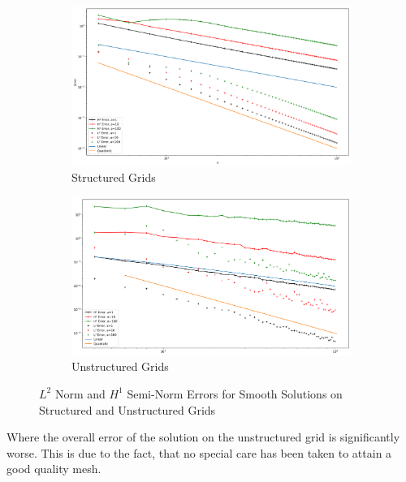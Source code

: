 \documentclass[11pt,a4paper]{article}
\begin{document}
\begin{multicols}{2}
\begin{figure}[H]
  \centering
  \begin{subfigure}{1\linewidth}
    \centering
    \includegraphics[width=1\linewidth]{errors_smooth_reg}
    \caption{Structured Grids}
    \label{fig:smooth_dirichlet_errs_str}
  \end{subfigure}

  \begin{subfigure}{1\linewidth}
    \centering
    \includegraphics[width=1\linewidth]{errors_smooth_irreg}
    \caption{Unstructured Grids}
    \label{fig:smooth_dirichlet_errs_unstr}
  \end{subfigure}
  \label{fig:smooth_dirichlet_errs}
  \caption{$L^2$ Norm and $H^1$ Semi-Norm Errors for Smooth Solutions on Structured and Unstructured Grids}
\end{figure}

Where the overall error of the solution on the unstructured grid is significantly worse.
This is due to the fact, that no special care has been taken to attain a good quality mesh.



\end{multicols}
\end{document}
